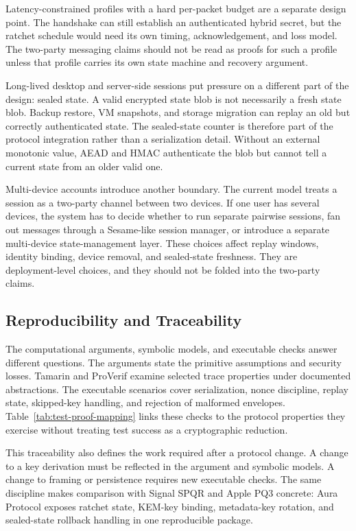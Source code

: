 \documentclass[preprint,12pt]{elsarticle}
\theoremstyle{definition}
\newcommand{\tech}[1]{\textnormal{#1}}
\newcommand{\SPQR}{\tech{SPQR}}
\newcommand{\PQThree}{\tech{PQ3}}
\begin{document}
Latency-constrained profiles with a hard per-packet budget are a separate design
point. The handshake can still establish an authenticated hybrid secret, but the
ratchet schedule would need its own timing, acknowledgement, and loss model. The
two-party messaging claims should not be read as proofs for such a profile
unless that profile carries its own state machine and recovery argument.

Long-lived desktop and server-side sessions put pressure on a different part of
the design: sealed state. A valid encrypted state blob is not necessarily a
fresh state blob. Backup restore, VM snapshots, and storage migration can replay
an old but correctly authenticated state. The sealed-state counter is therefore
part of the protocol integration rather than a serialization detail. Without an
external monotonic value, AEAD and HMAC authenticate the blob but cannot tell a
current state from an older valid one.

Multi-device accounts introduce another boundary. The current model treats a
session as a two-party channel between two devices. If one user has several
devices, the system has to decide whether to run separate pairwise sessions,
fan out messages through a Sesame-like session manager, or introduce a separate
multi-device state-management layer. These choices affect replay windows, identity binding,
device removal, and sealed-state freshness. They are deployment-level choices, and
they should not be folded into the two-party claims.

\subsection{Reproducibility and Traceability}

The computational arguments, symbolic models, and executable checks answer
different questions. The arguments state the primitive assumptions and
security losses. Tamarin and ProVerif examine selected trace properties under
documented abstractions. The executable scenarios cover serialization, nonce
discipline, replay state, skipped-key handling, and rejection of malformed
envelopes. Table~\ref{tab:test-proof-mapping} links these checks to the protocol
properties they exercise without treating test success as a cryptographic
reduction.

This traceability also defines the work required after a protocol change. A
change to a key derivation must be reflected in the argument and symbolic
models. A change to framing or persistence requires new executable checks. The
same discipline makes comparison with Signal \SPQR{} and Apple \PQThree{}
concrete: Aura Protocol exposes ratchet state, KEM-key binding, metadata-key
rotation, and sealed-state rollback handling in one reproducible package.
\end{document}

